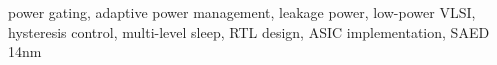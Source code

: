 \documentclass[journal]{IEEEtran}
\begin{document}
\begin{IEEEkeywords}
power gating, adaptive power management, leakage power, low-power VLSI, hysteresis control, multi-level sleep, RTL design, ASIC implementation, SAED 14nm
\end{IEEEkeywords}











\end{document}
